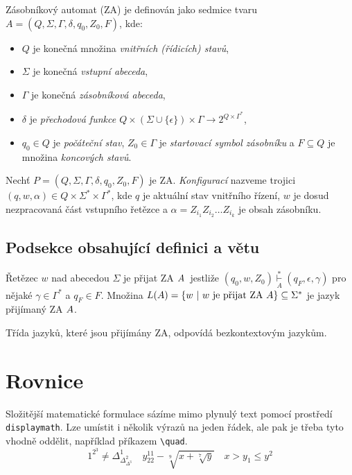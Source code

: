 \documentclass[a4paper, 11pt, twocolumn]{article}
\begin{document}
\begin{definice} \label{definice}
\textup{Zásobníkový automat} (ZA) je definován jako sedmice tvaru $A=(Q,\Sigma,\Gamma,\delta,q_0,Z_0,F)$, kde:
\begin{itemize}
    \item $Q$ je konečná množina \emph{vnitřních (řídicích) stavů},
    \item $\Sigma$ je konečná \emph{vstupní abeceda},
    \item $\Gamma$ je konečná \emph{zásobníková abeceda},
    \item $\delta$ je \emph{přechodová funkce $Q \times (\Sigma\cup\{\epsilon\})\times\Gamma\rightarrow 2^{Q\times\Gamma^\ast}$},
    \item $q_0 \in Q$ je \emph{počáteční stav}, $Z_0 \in \Gamma$ je \emph{startovací symbol zásobníku} a $F \subseteq Q$ je množina \emph{koncových stavů}.
\end{itemize}
\end{definice}

Nechť $P=(Q,\Sigma,\Gamma,\delta,q_0,Z_0,F)$ je ZA. \emph{Konfigurací} nazveme trojici $(q,w,\alpha) \in Q \times \Sigma^\ast \times \Gamma^\ast$, kde $q$ je aktuální stav vnitřního řízení, $w$ je dosud nezpracovaná část vstupního řetězce a $\alpha=Z_{i_1}Z_{i_2}\ldots Z_{i_k}$ je obsah zásobníku.

\subsection{Podsekce obsahující definici a větu}

\begin{definice} 
\textup{Řetězec $w$ nad abecedou $\Sigma$ je přijat ZA} $\mathnormal{A}$~jestliže $(q_0, w, Z_0)\overset{\ast}{\underset{A}{\vdash}}(q_F,\epsilon,\gamma)$ pro nějaké $\gamma\in\Gamma^*$ a $q_F \in F$. Množina $L(A)=\{w\ |\ w \mbox{ je přijat ZA } \mathnormal{A}\} \subseteq \Sigma^\ast $ je \textup{jazyk přijímaný ZA} $\mathnormal{A}$. 
\end{definice}

\begin{veta}
Třída jazyků, které jsou přijímány ZA, odpovídá \textup{bezkontextovým jazykům}.
\end{veta}

\section{Rovnice}
Složitější matematické formulace sázíme mimo plynulý text pomocí prostředí \verb|displaymath|. Lze umístit i několik výrazů na jeden řádek, ale pak je třeba tyto vhodně oddělit, například příkazem \verb|\quad|. 
\begin{displaymath}
    1^{2^3} \not= \Delta^1_{\Delta^2_{\Delta^3}} \quad y^{11}_{22}-\sqrt[9]{x+\sqrt[7]{y}} \quad x>y_1 \leq y^2
\end{displaymath}
\end{document}
